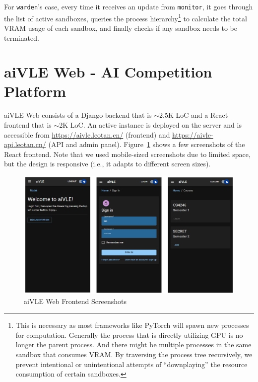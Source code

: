 For \texttt{warden}'s case, every time it receives an update from \texttt{monitor}, it goes through the list of active sandboxes, queries the process hierarchy\footnote{This is necessary as most frameworks like PyTorch will spawn new processes for computation. Generally the process that is directly utilizing GPU is no longer the parent process. And there might be multiple processes in the same sandbox that consumes VRAM. By traversing the process tree recursively, we prevent intentional or unintentional attempts of ``downplaying'' the resource consumption of certain sandboxes.} to calculate the total VRAM usage of each sandbox, and finally checks if any sandbox needs to be terminated.

\section{aiVLE Web - AI Competition Platform}
\label{ch:aivle-web}
aiVLE Web consists of a Django backend that is $\sim$2.5K LoC and a React frontend that is $\sim$2K LoC. An active instance is deployed on the server and is accessible from \href{https://aivle.leotan.cn/}{https://aivle.leotan.cn/} (frontend) and \href{https://aivle-api.leotan.cn/}{https://aivle-api.leotan.cn/} (API and admin panel). Figure~\ref{fig:aivle-web-frontend-screenshot} shows a few screenshots of the React frontend. Note that we used mobile-sized screenshots due to limited space, but the design is responsive (i.e., it adapts to different screen sizes).

\begin{figure}[H]
    \centering
    \includegraphics[width=\textwidth]{images/aivle-web-frontend-screenshot.png}
    \caption{aiVLE Web Frontend Screenshots}
    \label{fig:aivle-web-frontend-screenshot}
\end{figure}

